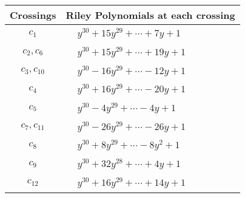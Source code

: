 \documentclass[1p]{elsarticle_modified}
\theoremstyle{definition}
\begin{document}
\begin{tabular}{m{50pt}|m{274pt}}
Crossings & \hspace{64pt}Riley Polynomials at each crossing \\
\hline $$\begin{aligned}c_{1}\end{aligned}$$&$\begin{aligned}
&y^{30}+15 y^{29}+\cdots+7 y+1
\end{aligned}$\\
\hline $$\begin{aligned}c_{2},c_{6}\end{aligned}$$&$\begin{aligned}
&y^{30}+15 y^{29}+\cdots+19 y+1
\end{aligned}$\\
\hline $$\begin{aligned}c_{3},c_{10}\end{aligned}$$&$\begin{aligned}
&y^{30}-16 y^{29}+\cdots-12 y+1
\end{aligned}$\\
\hline $$\begin{aligned}c_{4}\end{aligned}$$&$\begin{aligned}
&y^{30}+16 y^{29}+\cdots-20 y+1
\end{aligned}$\\
\hline $$\begin{aligned}c_{5}\end{aligned}$$&$\begin{aligned}
&y^{30}-4 y^{29}+\cdots-4 y+1
\end{aligned}$\\
\hline $$\begin{aligned}c_{7},c_{11}\end{aligned}$$&$\begin{aligned}
&y^{30}-26 y^{29}+\cdots-26 y+1
\end{aligned}$\\
\hline $$\begin{aligned}c_{8}\end{aligned}$$&$\begin{aligned}
&y^{30}+8 y^{29}+\cdots-8 y^2+1
\end{aligned}$\\
\hline $$\begin{aligned}c_{9}\end{aligned}$$&$\begin{aligned}
&y^{30}+32 y^{28}+\cdots+4 y+1
\end{aligned}$\\
\hline $$\begin{aligned}c_{12}\end{aligned}$$&$\begin{aligned}
&y^{30}+16 y^{29}+\cdots+14 y+1
\end{aligned}$\\
\hline
\end{tabular}\\~\\
\end{document}
